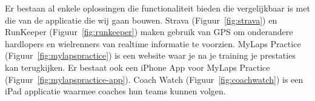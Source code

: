 \newcommand{\vergelijkbaresystemen}{}
\label{sec:vergelijkbare-systemen}

Er bestaan al enkele oplossingen die functionaliteit bieden die vergelijkbaar is met die van de applicatie die wij gaan bouwen. Strava (Figuur~\ref{fig:strava}) en RunKeeper (Figuur~\ref{fig:runkeeper}) maken gebruik van GPS om onderandere hardlopers en wielrenners van realtime informatie te voorzien. MyLaps Practice (Figuur~\ref{fig:mylapspractice}) is een website waar je na je training je prestaties kan terugkijken. Er bestaat ook een iPhone App voor MyLaps Practice (Figuur~\ref{fig:mylapspractice-app}). Coach Watch (Figuur~\ref{fig:coachwatch}) is een iPad applicatie waarmee coaches hun teams kunnen volgen.

\begin{figure}[ht]
\centering
{}


\end{figure}
